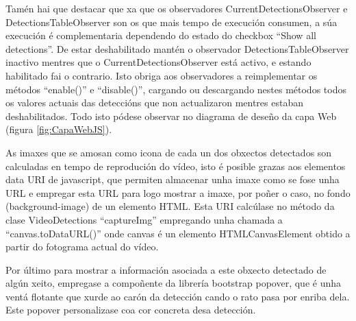     Tamén hai que destacar que xa que os observadores CurrentDetectionsObserver e 
    DetectionsTableObserver son os que mais tempo de execución consumen, a súa execución é 
    complementaria dependendo do estado do checkbox ``Show all detections''. De estar
    deshabilitado mantén o observador DetectionsTableObserver inactivo mentres que o 
    CurrentDetectionsObserver está activo, e estando habilitado fai o contrario. Isto obriga aos
    observadores a reimplementar os métodos ``enable()'' e ``disable()'', cargando ou
    descargando nestes métodos todos os valores actuais das deteccións que non actualizaron mentres
    estaban deshabilitados. Todo isto pódese observar no diagrama de deseño da capa Web (figura 
    \ref{fig:CapaWebJS}).
    
    
    As imaxes que se amosan como icona de cada un dos obxectos detectados son calculadas en tempo de
    reprodución do vídeo, isto é posible grazas aos elementos data URI\cite{data-uris} de javascript,
    que permiten almacenar unha imaxe como se fose unha URL e empregar esta URL para logo mostrar a 
    imaxe, por poñer o caso, no fondo (background-image) de un elemento HTML. Esta URI calcúlase 
    no método da clase VideoDetections ``captureImg'' empregando unha chamada a ``canvas.toDataURL()''
    onde canvas é un elemento HTMLCanvasElement obtido a partir do fotograma actual do vídeo.
    
    Por último para mostrar a información asociada a este obxecto detectado de algún xeito, 
    empregase a compoñente da librería bootstrap popover, que é unha ventá flotante que xurde ao
    carón da detección cando o rato pasa por enriba dela. Este popover personalizase coa cor 
    concreta desa detección.
    
